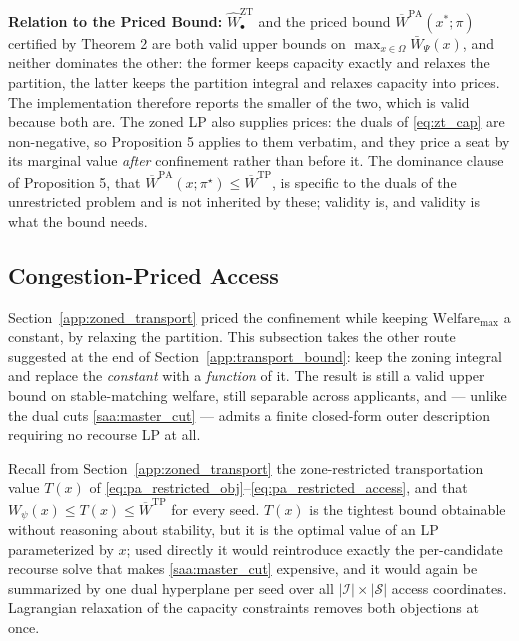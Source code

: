 \documentclass{article}
\begin{document}
\noindent\textbf{Relation to the Priced Bound:}
$\widehat{W}^{\mathrm{ZT}}_\bullet$ and the priced bound $\overline{W}^{\mathrm{PA}}(x^\ast; \pi)$ certified by Theorem 2 are both valid upper bounds on $\max_{x \in \Omega} \bar{W}_\Psi(x)$, and neither dominates the other: the former keeps capacity exactly and relaxes the partition, the latter keeps the partition integral and relaxes capacity into prices. The implementation therefore reports the smaller of the two, which is valid because both are. The zoned LP also supplies prices: the duals of \eqref{eq:zt_cap} are non-negative, so Proposition 5 applies to them verbatim, and they price a seat by its marginal value \emph{after} confinement rather than before it. The dominance clause of Proposition 5, that $\overline{W}^{\mathrm{PA}}(x; \pi^\star) \leq \overline{W}^{\mathrm{TP}}$, is specific to the duals of the unrestricted problem and is not inherited by these; validity is, and validity is what the bound needs.

\subsection{Congestion-Priced Access}
\label{app:priced_access}

Section~\ref{app:zoned_transport} priced the confinement while keeping $\text{Welfare}_{\max}$ a constant, by relaxing the partition. This subsection takes the other route suggested at the end of Section~\ref{app:transport_bound}: keep the zoning integral and replace the \emph{constant} with a \emph{function} of it. The result is still a valid upper bound on stable-matching welfare, still separable across applicants, and --- unlike the dual cuts \eqref{saa:master_cut} --- admits a finite closed-form outer description requiring no recourse LP at all.

Recall from Section~\ref{app:zoned_transport} the zone-restricted transportation value $T(x)$ of \eqref{eq:pa_restricted_obj}--\eqref{eq:pa_restricted_access}, and that $W_\psi(x) \leq T(x) \leq \overline{W}^{\mathrm{TP}}$ for every seed. $T(x)$ is the tightest bound obtainable without reasoning about stability, but it is the optimal value of an LP parameterized by $x$; used directly it would reintroduce exactly the per-candidate recourse solve that makes \eqref{saa:master_cut} expensive, and it would again be summarized by one dual hyperplane per seed over all $|\mathcal{I}| \times |\mathcal{S}|$ access coordinates. Lagrangian relaxation of the capacity constraints removes both objections at once.
\end{document}
